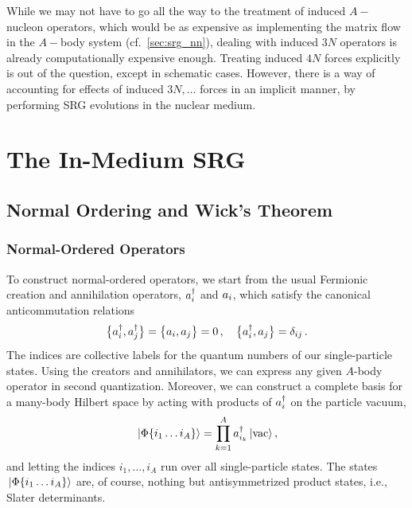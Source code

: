 {While we may not have to go all the way to the treatment of induced
$A-$nucleon operators, which would be as expensive as implementing 
the matrix flow in the $A-$body system (cf.~\ref{sec:srg_nn}),
dealing with induced $3N$ operators is already computationally 
expensive enough. Treating induced $4N$ forces explicitly is out 
of the question, except in schematic cases. However, there is a
way of accounting for effects of induced $3N,\ldots$ forces in
an implicit manner, by performing SRG evolutions in the nuclear
medium. 


\section{\label{sec:imsrg}The In-Medium SRG}
\tbd{[Bridge]}

\subsection{\label{sec:nord}Normal Ordering and Wick's Theorem}


%
%
\subsubsection{\label{sec:nord_ops}Normal-Ordered Operators}
To construct normal-ordered operators, we start from the usual Fermionic
creation and annihilation operators, $a^\dag_i$ and $a_i$, which satisfy
the canonical anticommutation relations
\begin{equation}
   \big\{ {a^\dag_i}, {a^\dag_j} \big\}  =  \big\{ {a_i}, {a_j} \big\}  = 0\,,\quad  \big\{ {a^\dag_i}, {a_j} \big\} =\delta_{ij}\,.
\end{equation}
The indices are collective labels for the quantum numbers of our single-particle 
states. Using the creators and annihilators, we can express any given $A$-body 
operator in second quantization. Moreover, we can construct a complete basis 
for a many-body Hilbert space by acting with products of $a^\dag_i$ on the particle 
vacuum,
\begin{equation}\label{eq:vacbasis}
  \ket{\Phi\{i_1\ldots i_A\}}=\prod_{k=1}^A\aaO_{i_k}\ket{\text{vac}}\,,
\end{equation}
and letting the indices $i_1,\ldots,i_A$ run over all single-particle states.
The states $\,|{\Phi\{i_1\ldots i_A\}}\rangle$ are, of course, nothing but 
antisymmetrized product states, i.e., Slater determinants.

}
